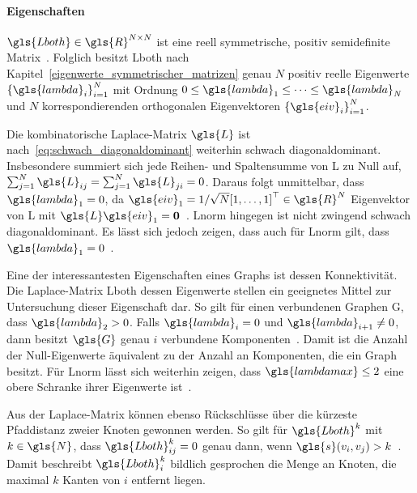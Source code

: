 \paragraph{Eigenschaften}
\label{laplace_eigenschaften}

$\gls{Lboth} \in \gls{R}^{N \times N}$ ist eine reell symmetrische, positiv semidefinite Matrix~\cite{Chung}.
Folglich besitzt \gls{Lboth} nach Kapitel~\ref{eigenwerte_symmetrischer_matrizen} genau $N$ positiv reelle Eigenwerte ${\left\{\gls{lambda}_i\right\}}_{i=1}^N$ mit Ordnung $0 \leq \gls{lambda}_1 \leq \cdots \leq \gls{lambda}_N$ und $N$ korrespondierenden orthogonalen Eigenvektoren ${\left\{\gls{eiv}_i\right\}}_{i=1}^N$.

Die kombinatorische Laplace-Matrix $\gls{L}$ ist nach~\eqref{eq:schwach_diagonaldominant} weiterhin schwach diagonaldominant.
Insbesondere summiert sich jede Reihen- und Spaltensumme von \gls{L} zu Null auf, \dhe{} $\sum_{j=1}^N \gls{L}_{ij} = \sum_{j=1}^N \gls{L}_{ji} = 0$.
Daraus folgt unmittelbar, dass $\gls{lambda}_1 = 0$, da $\gls{eiv}_1 = 1/\sqrt{N}{\left[1, \ldots, 1\right]}^{\top} \in \gls{R}^N$ Eigenvektor von \gls{L} mit $\gls{L}\gls{eiv}_1 = \ve{0}$~\cite{Shuman}.
\gls{Lnorm} hingegen ist nicht zwingend schwach diagonaldominant.
Es lässt sich jedoch zeigen, dass auch für \gls{Lnorm} gilt, dass $\gls{lambda}_1 = 0$~\cite{Chung}.

Eine der interessantesten Eigenschaften eines Graphs ist dessen Konnektivität.
Die Laplace-Matrix \gls{Lboth} \bzw{} dessen Eigenwerte stellen ein geeignetes Mittel zur Untersuchung dieser Eigenschaft dar.
So gilt \zB{} für einen verbundenen Graphen \gls{G}, dass $\gls{lambda}_2 > 0$.
Falls $\gls{lambda}_i = 0$ und $\gls{lambda}_{i+1} \neq 0$, dann besitzt $\gls{G}$ genau $i$ verbundene Komponenten~\cite{Chung}.
Damit ist die Anzahl der Null-Eigenwerte äquivalent zu der Anzahl an Komponenten, die ein Graph besitzt.
Für \gls{Lnorm} lässt sich weiterhin zeigen, dass $\gls{lambdamax} \leq 2$ eine obere Schranke ihrer Eigenwerte ist~\cite{Chung}.

Aus der Laplace-Matrix können ebenso Rückschlüsse über die kürzeste Pfaddistanz zweier Knoten gewonnen werden.
So gilt für $\gls{Lboth}^{k}$ mit $k \in \gls{N}$, dass $\gls{Lboth}^k_{ij} = 0$ genau dann, wenn $\gls{s}\left(v_i, v_j\right) > k$~\cite{Hammond}.
Damit beschreibt $\gls{Lboth}^k_i$ bildlich gesprochen die Menge an Knoten, die maximal $k$ Kanten von $i$ entfernt liegen.
